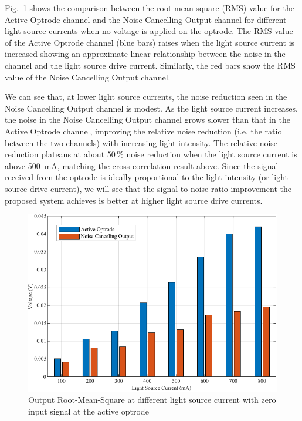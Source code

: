 Fig.~\ref{fig_RMS value for ch1 and DSP output} shows the comparison between the root mean square (RMS) value for the Active Optrode channel and the Noise Cancelling Output channel for different light source currents when no voltage is applied on the optrode.  The RMS value of the Active Optrode channel (blue bars) raises when the light source current is increased showing an approximate linear relationship between the noise in the channel and the light source drive current. Similarly, the red bars show the RMS value of the Noise Cancelling Output channel. 

We can see that, at lower light source currents, the noise reduction seen in the Noise Cancelling Output channel is modest.  As the light source current increases, the noise in the Noise Cancelling Output channel grows slower than that in the Active Optrode channel, improving the relative noise reduction (i.e. the ratio between the two channels) with increasing light intensity.  The relative noise reduction plateaus at about 50\,\% noise reduction when the light source current is above \qty{500}{mA}, matching the cross-correlation result above.  Since the signal received from the optrode is ideally proportional to the light intensity (or light source drive current), we will see that the signal-to-noise ratio improvement the proposed system achieves is better at higher light source drive currents. 

\begin{figure}[htbp]
\centerline{\includegraphics[scale=1]{5-Experiment/RMS value for ch1 and DSP output.pdf}}
\caption{Output Root-Mean-Square at different light source current with zero input signal at the active optrode}
\label{fig_RMS value for ch1 and DSP output}
\end{figure}

